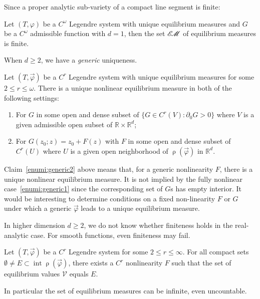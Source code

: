 \documentclass[AHL, Unicode, longabstracts,published]{cedram}
\theoremstyle{plain}
\theoremstyle{plain}
\newcommand\vpot{\vec\pot}
\DeclareMathOperator{\interior}{int}
\newcommand{\rs}{\operatorname{\rho}}
\newcommand{\EM}{\mathscr{E\kern-2pt M}}
\newcommand{\pot}{\varphi}
\newcounter{In}
\newcommand*\8{\infty}
\newcommand\RR{\mathbb{R}}
\newcommand{\scV}{\mathscr{V}}
\newcommand*{\romanenumi}{\renewcommand*{\theenumi}{\roman{enumi}}}
\begin{document}
Since a proper analytic sub-variety of a compact line segment is finite:

\begin{coro}\label{cor-finite-1D}
Let $(T,\pot)$ be a $C^\omega$ Legendre system with unique equilibrium measures and $G$ be a $C^\omega$ admissible function with $d=1$, then the set $\EM$ of equilibrium measures is finite.
\end{coro}

When $d\ge2$, we have a \emph{generic} uniqueness.

\begin{prop}\label{p-generic-unique}
Let $(T, \vpot)$ be a $C^r$ Legendre system with unique equilibrium measures for some $2\leq r\leq\omega$. There is a unique nonlinear equilibrium measure in both of the following settings:
\begin{enumerate}\romanenumi
\item\label{enumi:generic1}
For $G$ in some open and dense subset of $\{G\in C^r(V):\partial_0 G>0\}$ where $V$ is a given admissible open subset of $\RR\times\RR^d$;
\item\label{enumi:generic2}
For $G(z_0;z)=z_0+F(z)$ with $F$ in some open and dense subset of $C^r(U)$ where $U$ is a given open neighborhood of $\rs(\vpot)$ in $\RR^d$.
\end{enumerate}
\end{prop}

Claim~\eqref{enumi:generic2} above means that, for a generic nonlinearity $F$, there is a unique nonlinear equilibrium measure. It is not implied by the fully nonlinear case~\eqref{enumi:generic1} since the corresponding set of $G$s has empty interior. It would be interesting to determine conditions on a fixed non-linearity $F$ or $G$ under which a generic $\vpot$ leads to a unique equilibrium measure.


In higher dimension $d\ge 2$, we do not know whether finiteness holds in the real-analytic case. For smooth functions, even finiteness may fail.


\begin{prop}\label{prop-flexibility}
Let $(T, \vpot)$ be a {$C^r$ Legendre system} for some $2\leq r\leq\infty$. For all compact sets $\emptyset\ne E\subset\interior \rs(\vpot)$, there exists a $C^r$ nonlinearity $F$ such that the set of equilibrium values $\scV$ equals $E$.

In particular the set of equilibrium measures can be infinite, even uncountable.
\end{prop}
\end{document}
